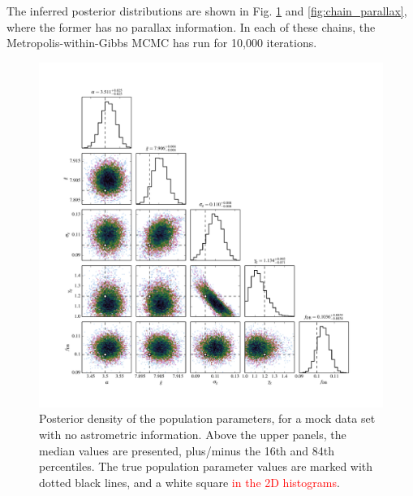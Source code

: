 \documentclass[fleqn,usenatbib]{mnras}
\newcommand{\changes}[1]{\textcolor{red}{#1}}
\begin{document}
The inferred posterior distributions are shown in Fig. \ref{fig:chain} and \ref{fig:chain_parallax}, where the former has no parallax information. In each of these chains, the Metropolis-within-Gibbs MCMC has run for 10,000 iterations.

\begin{figure}
	\includegraphics[width=1.\textwidth]{toy_chain.pdf}
    \caption{ Posterior density of the population parameters, for a mock data set with no astrometric information. Above the upper panels, the median values are presented, plus/minus the 16th and 84th percentiles. The true population parameter values are marked with dotted black lines, and a white square \changes{in the 2D histograms}.}
    \label{fig:chain}
\end{figure}
\end{document}
